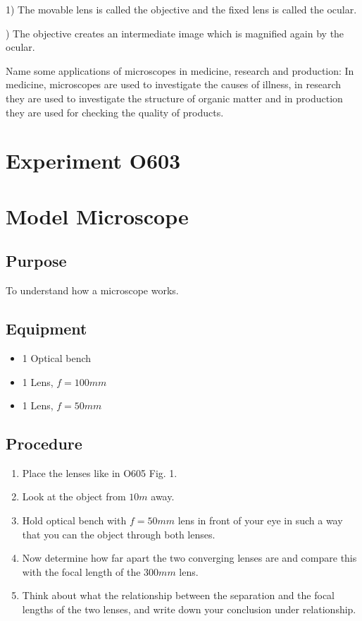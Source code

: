 \documentclass[12pt]{article}
\begin{document}
1) The movable lens is called the objective and the fixed lens is called the ocular.

) The objective creates an intermediate image which is magnified again by the ocular.

Name some applications of microscopes in medicine, research and production:
In medicine, microscopes are used to investigate the causes of illness, in research they are used to investigate the structure of organic matter and in production they are used for checking the quality of products.



\newpage

\section*{Experiment O603}

\section*{Model Microscope}

\subsection*{Purpose}

To understand how a microscope works.

\subsection*{Equipment}

\begin{itemize}
\item 1 Optical bench
\item 1 Lens, $f=100 mm$
\item 1 Lens, $f=50 mm$
\end{itemize}

\subsection*{Procedure}

\begin{enumerate}
\item Place the lenses like in O605 Fig. 1.
\item Look at the object from $10m$ away.
\item Hold optical bench with $f=50mm$ lens in front of your eye in such a way that you can the object through both lenses.
\item Now determine how far apart the two converging lenses are and compare this with the focal length of the $300mm$ lens.
\item Think about what the relationship between the separation and the focal lengths of the two lenses, and write down your conclusion under relationship.
\end{enumerate}
\end{document}
